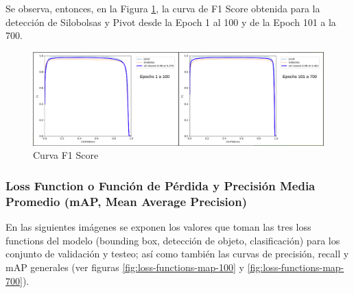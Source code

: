 Se observa, entonces, en la Figura \ref{fig:f1-score}, la curva de F1 Score obtenida para la detección de Silobolsas y Pivot desde la Epoch 1 al 100 y de la Epoch 101 a la 700.
\begin{figure}[h!]
    \centering
    \includegraphics[width=1\textwidth]{img/F1-Score.png}
    \caption{Curva F1 Score}
    \label{fig:f1-score}
\end{figure}


\subsubsection{Loss Function o Función de Pérdida y Precisión Media Promedio (mAP, Mean Average Precision)}
En las siguientes imágenes se exponen los valores que toman las tres loss functions del modelo (bounding box, detección de objeto, clasificación) para los conjunto de validación y testeo; así como también las curvas de precisión, recall y mAP generales (ver figuras \ref{fig:loss-functions-map-100} y \ref{fig:loss-functions-map-700}).\\


